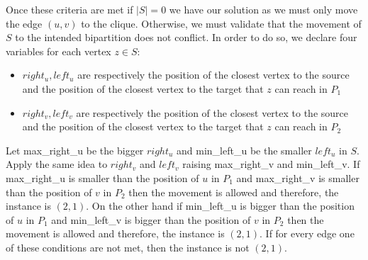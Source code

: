 Once these criteria are met if $|S|=0$ we have our solution as we must only move the edge $(u,v)$ to the clique.
Otherwise, we must validate that the movement of $S$ to the intended bipartition does not conflict.
In order to do so, we declare four variables for each vertex $z \in S$:

\begin{itemize}
  \item $right_u, left_u$ are respectively the position of the closest vertex to the source and the position of the closest vertex to the target that $z$ can reach in $P_1$
  \item $right_v, left_v$ are respectively the position of the closest vertex to the source and the position of the closest vertex to the target that $z$ can reach in $P_2$
\end{itemize}

Let max\_right\_u be the bigger $right_u$ and min\_left\_u be the smaller $left_u$ in $S$.
Apply the same idea to $right_v$ and $left_v$ raising max\_right\_v and min\_left\_v.
If max\_right\_u is smaller than the position of $u$ in $P_1$ and max\_right\_v is smaller than the position of $v$ in $P_2$ then the movement is allowed and therefore, the instance is $(2,1)$.
On the other hand if min\_left\_u is bigger than the position of $u$ in $P_1$ and min\_left\_v is bigger than the position of $v$ in $P_2$ then the movement is allowed and therefore, the instance is $(2,1)$.
If for every edge one of these conditions are not met, then the instance is not $(2,1)$.


